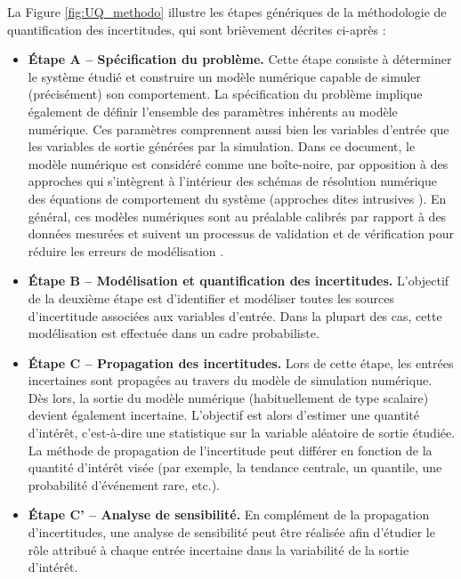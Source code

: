 La Figure \ref{fig:UQ_methodo} illustre les étapes génériques de la méthodologie de quantification des incertitudes, qui sont brièvement décrites ci-après :
\begin{itemize}
    \item[\textbullet] \textbf{\'Etape A -- Spécification du problème.} Cette étape consiste à déterminer le système étudié et construire un modèle numérique capable de simuler (précisément) son comportement. 
    La spécification du problème implique également de définir l'ensemble des paramètres inhérents au modèle numérique. 
    Ces paramètres comprennent aussi bien les variables d'entrée que les variables de sortie générées par la simulation. 
    Dans ce document, le modèle numérique est considéré comme une boîte-noire, par opposition à des approches qui s'intègrent à l'intérieur des schémas de résolution numérique des équations de comportement du système (approches dites intrusives \cite{lemaitre_2010}). 
    En général, ces modèles numériques sont au préalable calibrés par rapport à des données mesurées et suivent un processus de validation et de vérification pour réduire les erreurs de modélisation  \cite{oberkampf_2010_VVUQ}.
    \item[\textbullet] \textbf{\'Etape B -- Modélisation et quantification des incertitudes.} L'objectif de la deuxième étape est d'identifier et modéliser toutes les sources d'incertitude associées aux variables d'entrée. 
    Dans la plupart des cas, cette modélisation est effectuée dans un cadre probabiliste.
    \item[\textbullet] \textbf{\'Etape C -- Propagation des incertitudes.} Lors de cette étape, les entrées incertaines sont propagées au travers du modèle de simulation numérique. 
    Dès lors, la sortie du modèle numérique (habituellement de type scalaire) devient également incertaine. 
    L'objectif est alors d'estimer une quantité d'intérêt, c'est-à-dire une statistique sur la variable aléatoire de sortie étudiée. 
    La méthode de propagation de l'incertitude peut différer en fonction de la quantité d'intérêt visée (par exemple, la tendance centrale, un quantile, une probabilité d'événement rare, etc.). 
    \item[\textbullet] \textbf{\'Etape C' -- Analyse de sensibilité.} En complément de la propagation d'incertitudes, une analyse de sensibilité peut être réalisée afin d'étudier le rôle attribué à chaque entrée incertaine dans la variabilité de la sortie d'intérêt.

\end{itemize}
